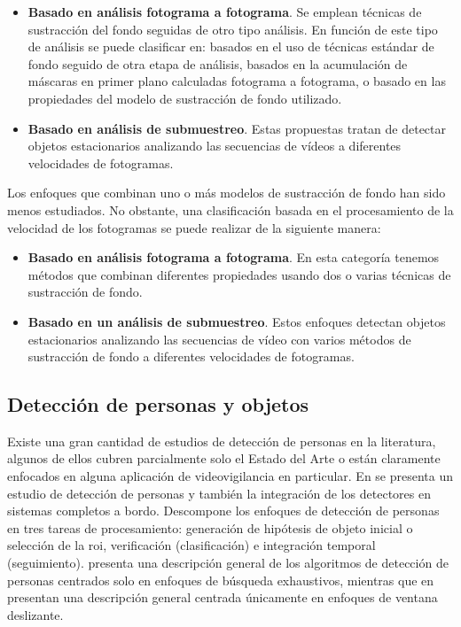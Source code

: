 \begin{itemize}
    \item \textbf{Basado en análisis fotograma a fotograma}. Se emplean técnicas de sustracción del fondo seguidas de otro tipo análisis. En función de este tipo de análisis se puede clasificar en: basados en el uso de técnicas estándar de fondo seguido de otra etapa de análisis, basados en la acumulación de máscaras en primer plano calculadas fotograma a fotograma, o basado en las propiedades del modelo de sustracción de fondo utilizado.
    \item \textbf{Basado en análisis de submuestreo}. Estas propuestas tratan de detectar objetos estacionarios analizando las secuencias de vídeos a diferentes velocidades de fotogramas. 
\end{itemize}

Los enfoques que combinan uno o más modelos de sustracción de fondo han sido menos estudiados. No obstante, una clasificación basada en el procesamiento de la velocidad de los fotogramas se puede realizar de la siguiente manera:

\begin{itemize}
    \item \textbf{Basado en análisis fotograma a fotograma}. En esta categoría tenemos métodos que combinan diferentes propiedades usando dos o varias técnicas de sustracción de fondo.
    \item \textbf{Basado en un análisis de submuestreo}. Estos enfoques detectan objetos estacionarios analizando las secuencias de vídeo con varios métodos de sustracción de fondo a diferentes velocidades de fotogramas.
\end{itemize}

\subsection{Detección de personas y objetos}
\label{subsec:tecnicas-deteccion-personas-objetos}

Existe una gran cantidad de estudios de detección de personas en la literatura, algunos de ellos cubren parcialmente solo el Estado del Arte o están claramente enfocados en alguna aplicación de videovigilancia en particular. En \cite{4657363} se presenta un estudio de detección de personas y también la integración de los detectores en sistemas completos a bordo. Descompone los enfoques de detección de personas en tres tareas de procesamiento: generación de hipótesis de objeto inicial o selección de la \gls{roi}, verificación (clasificación) e integración temporal (seguimiento). \cite{simonnet2012} presenta una descripción general de los algoritmos de detección de personas centrados solo en enfoques de búsqueda exhaustivos, mientras que en \cite{5975165} presentan una descripción general centrada únicamente en enfoques de ventana deslizante.

